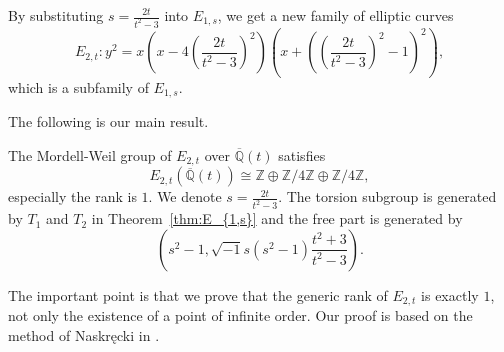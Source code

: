 \documentclass[main]{subfiles}
\begin{document}
By substituting $s = \frac{2t}{t^{2} - 3}$ into $E_{1,s}$, we get a new family of elliptic curves
\begin{equation*}
    E_{2,t}: y^{2} = x \left(x - 4 \left(\frac{2t}{t^{2} - 3} \right)^{2} \right) \left(x + \left(\left(\frac{2t}{t^{2} - 3} \right)^{2} - 1 \right)^{2} \right),
\end{equation*}
which is a subfamily of $E_{1,s}$.

The following is our main result.
\begin{thm}
    \label{thm:E_{2,t}}
    The Mordell-Weil group of $E_{2,t}$ over $\overline{\mathbb{Q}}(t)$ satisfies
    \begin{equation*}
        E_{2,t}(\overline{\mathbb{Q}}(t)) \cong \mathbb{Z} \oplus \mathbb{Z} / 4 \mathbb{Z} \oplus \mathbb{Z} / 4 \mathbb{Z},
    \end{equation*}
    especially the rank is $1$.
    We denote $s = \frac{2t}{t^{2} - 3}$. The torsion subgroup is generated by $T_1$ and $T_2$ in Theorem~\ref{thm:E_{1,s}} and the free part is generated by
    \begin{equation*}
        \left(s^{2} - 1, \sqrt{-1} s(s^{2} - 1) \frac{t^{2} + 3}{t^{2} - 3} \right).
    \end{equation*}
\end{thm}
The important point is that we prove that the generic rank of $E_{2,t}$ is exactly $1$, not only the existence of a point of infinite order.
Our proof is based on the method of Naskręcki in \cite{ref:naskrecki2013}.
\end{document}
